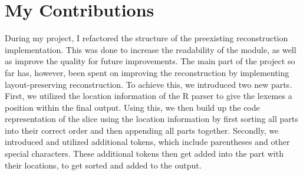 \documentclass[a3paper, portrait, english, default]{uulm-cs-poster}
\begin{document}
\section*{My Contributions}
\begin{multicols}{4}
During my project, I refactored the structure of the preexisting reconstruction implementation. This was done to increase the readability of the module, as well as improve the quality for future improvements. The main part of the project so far has, however, been spent on improving the reconstruction by implementing layout-preserving reconstruction. To achieve this, we introduced two new parts. First, we utilized the location information of the R parser to give the lexemes a position within the final output. Using this, we then build up the code representation of the slice using the location information by first sorting all parts into their correct order and then appending all parts together. Secondly, we introduced and utilized additional tokens, which include parentheses and other special characters. These additional tokens then get added into the part with their locations, to get sorted and added to the output.
\end{multicols}
\end{document}
